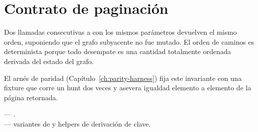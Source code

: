 \section{Contrato de paginación}

\begin{invariant}
Dos llamadas consecutivas a  con los mismos
parámetros devuelven el mismo orden, suponiendo que el grafo
subyacente no fue mutado. El orden de caminos es determinista
porque todo desempate es una cantidad totalmente ordenada
derivada del estado del grafo.
\end{invariant}

El arnés de paridad (Capítulo~\ref{ch:parity-harness}) fija este
invariante con una fixture que corre un hunt dos veces y
asevera igualdad elemento a elemento de la página retornada.

\begin{inthecode}
 ---
.\\
 --- variantes de
 y helpers de derivación de clave.
\end{inthecode}

